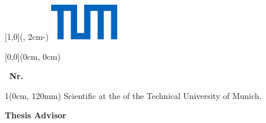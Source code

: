 \thispagestyle{empty}
\phantom{Hi mom!} %
\textblockorigin{\SeitenrandLinks}{\SeitenrandOben} %

{\sffamily

\begin{textblock*}{\UniversitaetLogoBreite}[1,0](\textwidth-1mm, 2cm-\SeitenrandOben)%
    \raggedleft\includegraphics{./00_Settings/TUM_Logo_RGB.pdf}%
\end{textblock*}



\begin{textblock*}{\textwidth}[0,0](0cm, 0cm)%
{\fontsize{24pt}{26pt}\selectfont\textbf{\thema}}


\vspace*{14pt}
{\fontsize{18pt}{27pt}\selectfont\textbf{\artderarbeit \, Nr. \, \arbeitnr}}
\end{textblock*}



\begin{textblock*}{1\textwidth}(0cm, 120mm)
	\fontsize{15pt}{17.5pt}\selectfont%
	Scientific %
	at the \fakultaet{} \ifthenelse{\equal{\studiengang}{}}{\\}{}%
	of the Technical University of Munich.
	
	\renewcommand{\baselinestretch}{1}
	\normalsize\selectfont
	\vspace*{12mm}
	\textbf{Thesis Advisor}\tab\hspace{-3cm}
	\begin{minipage}[t]{\textwidth-\CurrentLineWidth}
		\themenstellerlehrstuhl\\
		\themensteller
		\ifthenelse{\equal{\themenstellerlehrstuhl}{\betreutvonlehrstuhl}}
		{%
			{\strut}}{\strut}
	\end{minipage}
	

\end{textblock*}}

